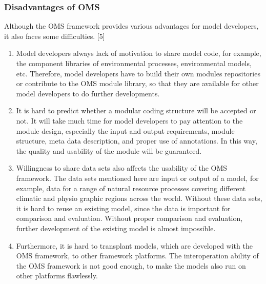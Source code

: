 \subsubsection{Disadvantages of OMS}
\par
Although the OMS framework provides various advantages for model developers, it also faces some difficulties. [5]
\begin{enumerate}
\item Model developers always lack of motivation to share model code, for example, the component libraries of environmental processes, environmental models, etc. Therefore, model developers have to build their own modules repositories or contribute to the OMS module library, so that they are available for other model developers to do further developments.

\item It is hard to predict whether a modular coding structure will be accepted or not. It will take much time for model developers to pay attention to the module design, especially the input and output requirements, module structure, meta data description, and proper use of annotations. In this way, the quality and usability of the module will be guaranteed.

\item Willingness to share data sets also affects the usability of the OMS framework. The data sets mentioned here are input or output of a model, for example, data for a range of natural resource processes covering different climatic and physio graphic regions across the world. Without these data sets, it is hard to reuse an existing model, since the data is important for comparison and evaluation. Without proper comparison and evaluation, further development of the existing model is almost impossible.

\item Furthermore, it is hard to transplant models, which are developed with the OMS framework, to other framework platforms. The interoperation ability of the OMS framework is not good enough, to make the models also run on other platforms flawlessly.

\end{enumerate}